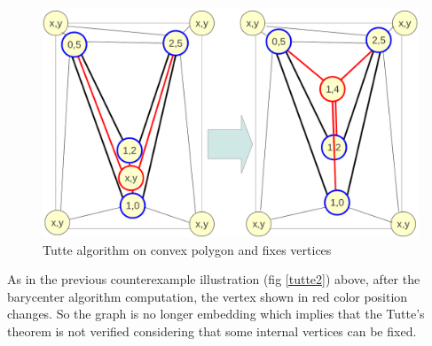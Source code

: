\begin {figure}[H]
  \centering
  \includegraphics[scale=0.3]{img/tutte3.png}
  \caption{Tutte algorithm on convex polygon and fixes vertices}
  \label{tutte3}
\end {figure}
\noindent

As in the previous counterexample illustration (fig \ref{tutte2}) above, after the barycenter algorithm computation, the vertex shown in red color position changes. So the graph is no longer embedding which implies that the Tutte's theorem is not verified considering that some internal vertices can be fixed.
